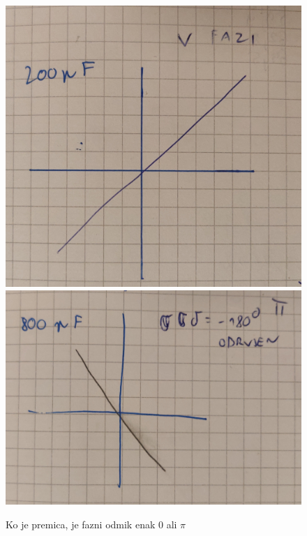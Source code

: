 \documentclass[a4paper]{report}
\begin{document}
\begin{figure}[htp]
    \centering
    \includegraphics[width=\textwidth]{Lisajeva skor premica1.png}
    \includegraphics[width=\textwidth]{Lisajeva skor premica2.png}
    \caption{Ko je premica, je fazni odmik enak 0 ali $\pi$}
    \label{fig:galaxy}
\end{figure}
\end{document}
